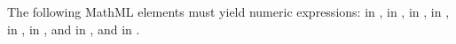 The following MathML elements must yield numeric expressions: 
in \KineticLaw,  in \SpeciesReference,
 in \InitialAssignment,  in \AssignmentRule,
 in \RateRule,  in \AlgebraicRule,
and  in \Event, and  in \EventAssignment.


